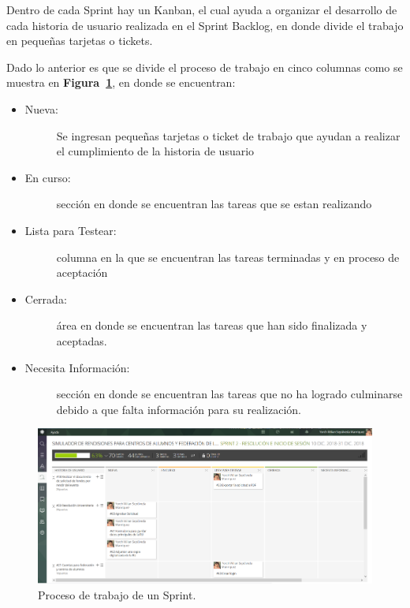 Dentro de cada Sprint hay un Kanban, el cual ayuda a organizar el desarrollo de cada historia de usuario realizada en el Sprint Backlog, en donde divide el trabajo en pequeñas tarjetas o tickets.

Dado lo anterior es que se divide el proceso de trabajo en cinco columnas como se muestra en \textbf{Figura~\ref{fig: kanbanSprint}}, en donde se encuentran:

\begin{itemize}
	\item 	\begin{description}
				\item[Nueva:] Se ingresan pequeñas tarjetas o ticket de trabajo que ayudan a realizar el cumplimiento de la historia de usuario 
			\end{description}

	\item 	\begin{description}
				\item[En curso:] sección en donde se encuentran las tareas que se estan realizando
			\end{description}

	\item 	\begin{description}
			    \item[Lista para Testear:] columna en la que se encuentran las tareas terminadas y en proceso de aceptación
			\end{description}

	\item 	\begin{description}
				\item[Cerrada:] área en donde se encuentran las tareas que han sido finalizada y aceptadas.
			\end{description}
	
	\item 	\begin{description}
				\item[Necesita Información:] sección en donde se encuentran las tareas que no ha logrado culminarse debido a que falta información para su realización.
			\end{description}
\end{itemize}

\begin{figure}[h!]
	\includegraphics[width=\textwidth]{Imagenes/Kanban.png}
	\caption{\label{fig: kanbanSprint} Proceso de trabajo de un Sprint.}
\end{figure}